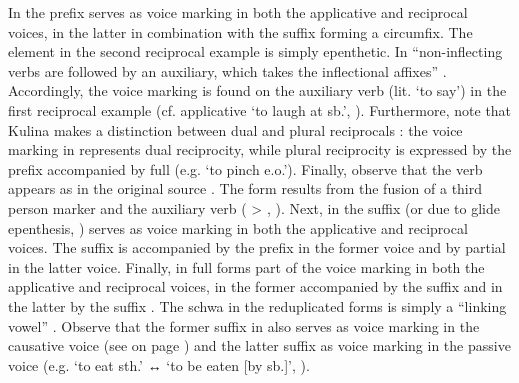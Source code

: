 In  the prefix  serves as voice marking in both the applicative and reciprocal voices, in the latter in combination with the suffix  forming a circumfix. The element  in the second reciprocal example is simply epenthetic. In  “non-inflecting verbs are followed by an auxiliary, which takes the inflectional affixes” \citep[7]{dienst:2014}. Accordingly, the voice marking  is found on the auxiliary verb  (lit. ‘to say’) in the first reciprocal example (cf. applicative  ‘to laugh at sb.’, \citealt[103]{dienst:2014}). Furthermore, note that Kulina makes a distinction between dual and plural reciprocals \citep[129ff.]{dienst:2014}: the voice marking in  represents dual reciprocity, while plural reciprocity is expressed by the prefix  accompanied by full  (e.g.  ‘to pinch e.o.’). Finally, observe that the verb  appears as  in the original source \citep[78]{dienst:2014}. The form  results from the fusion of a third person marker  and the auxiliary verb  ( > , \citealt[141]{dienst:2014}). Next, in  the suffix  (or  due to glide epenthesis, \citealt[41f.]{davies:2010}) serves as voice marking in both the applicative and reciprocal voices. The suffix is accompanied by the prefix  in the former voice and by partial  in the latter voice. Finally, in  full  forms part of the voice marking in both the applicative and reciprocal voices, in the former accompanied by the suffix  and in the latter by the suffix . The schwa in the reduplicated forms is simply a “linking vowel” \citep[xxi]{belay:2015}. Observe that the former suffix in  also serves as voice marking in the causative voice (see  on page \pageref{tab:ch4:caus-appl-khimtanga}) and the latter suffix as voice marking in the passive voice (e.g.  ‘to eat sth.’ ↔  ‘to be eaten [by sb.]’, \citealt[235]{belay:2015}).

